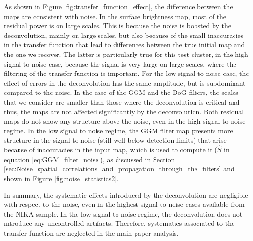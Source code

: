 \documentclass[twocolumn,traditabstract]{aa}
\begin{document}
{As shown in Figure \ref{fig:transfer_function_effect}, the difference between the maps are consistent with noise. In the surface brightness map, most of the residual power is on large scales. This is because the noise is boosted by the deconvolution, mainly on large scales, but also because of the small inaccuracies in the transfer function that lead to differences between the true initial map and the one we recover. The latter is particularly true for this test cluster, in the high signal to noise case, because the signal is very large on large scales, where the filtering of the transfer function is important. For the low signal to noise case, the effect of errors in the deconvolution has the same amplitude, but is subdominant compared to the noise. In the case of the GGM and the DoG filters, the scales that we consider are smaller than those where the deconvolution is critical and thus, the maps are not affected significantly by the deconvolution. Both residual maps do not show any structure above the noise, even in the high signal to noise regime. In the low signal to noise regime, the GGM filter map presents more structure in the signal to noise (still well below detection limits) that arise because of inaccuracies in the input map, which is used to compute it ($\hat{S}$ in equation \ref{eq:GGM_filter_noise}), as discussed in Section \ref{sec:Noise_spatial_correlations_and_propagation_through_the_filters} and shown in Figure \ref{fig:noise_statistics2}.

In summary, the systematic effects introduced by the deconvolution are negligible with respect to the noise, even in the highest signal to noise cases available from the NIKA sample. In the low signal to noise regime, the deconvolution does not introduce any uncontrolled artifacts. Therefore, systematics associated to the transfer function are neglected in the main paper analysis.}
\end{document}
